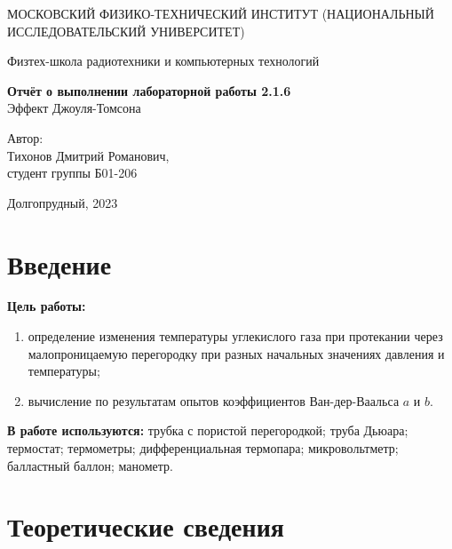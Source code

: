 \documentclass[a4paper, 12pt]{article}
\begin{document}
    \begin{titlepage}
	\begin{center}
            {\large МОСКОВСКИЙ ФИЗИКО-ТЕХНИЧЕСКИЙ ИНСТИТУТ (НАЦИОНАЛЬНЫЙ       ИССЛЕДОВАТЕЛЬСКИЙ УНИВЕРСИТЕТ)}
	\end{center}
 
	\begin{center}
		{\large Физтех-школа радиотехники и компьютерных технологий}
	\end{center}
	
	\vspace{8cm}
	{\LARGE
		\begin{center}
                {\bf Отчёт о выполнении лабораторной работы 2.1.6}\\
                Эффект Джоуля-Томсона
		\end{center}
	}
	\vspace{5cm}
	\begin{flushright}
		{\Large Автор:\\ Тихонов Дмитрий Романович, \\
			\vspace{0.2cm}
			студент группы Б01-206}
	\end{flushright}
	\vspace{5cm}
	\begin{center}
		\Large Долгопрудный, 2023
	\end{center}
    \end{titlepage}

    \section*{Введение}

    \noindent \textbf{Цель работы:}  
    \begin{enumerate}
        \item определение изменения температуры углекислого газа при протекании через малопроницаемую перегородку при разных начальных значениях давления и температуры;
        \item вычисление по результатам опытов коэффициентов Ван-дер-Ваальса $a$ и $b$.
    \end{enumerate}

    \noindent \textbf{В работе используются:} трубка с пористой перегородкой; труба Дьюара; термостат; термометры; дифференциальная термопара; микровольтметр; балластный баллон; манометр.
    
    \section*{Теоретические сведения}
\end{document}
